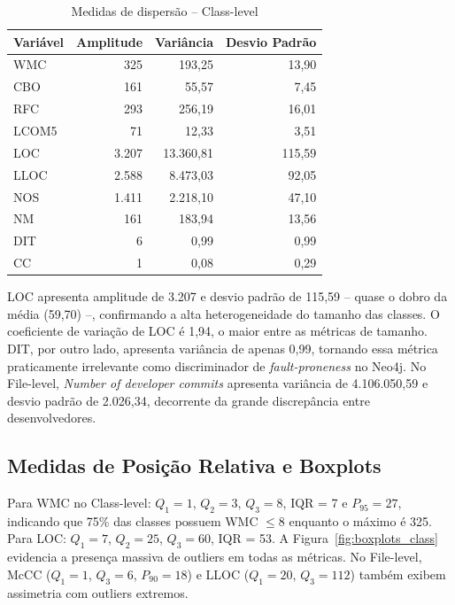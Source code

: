 \documentclass[conference]{IEEEtran}
\begin{document}
\begin{table}[htbp]
\caption{Medidas de dispersão -- Class-level}
\label{tab:dispersao_class}
\centering
\footnotesize
\begin{tabular}{lrrr}
\toprule
\textbf{Variável} & \textbf{Amplitude} & \textbf{Variância} & \textbf{Desvio Padrão} \\
\midrule
WMC   &     325 &      193,25 &  13,90 \\
CBO   &     161 &       55,57 &   7,45 \\
RFC   &     293 &      256,19 &  16,01 \\
LCOM5 &      71 &       12,33 &   3,51 \\
LOC   &   3.207 &   13.360,81 & 115,59 \\
LLOC  &   2.588 &    8.473,03 &  92,05 \\
NOS   &   1.411 &    2.218,10 &  47,10 \\
NM    &     161 &      183,94 &  13,56 \\
DIT   &       6 &        0,99 &   0,99 \\
CC    &       1 &        0,08 &   0,29 \\
\bottomrule
\end{tabular}
\end{table}

LOC apresenta amplitude de 3.207 e desvio padrão de 115,59 -- quase o dobro da média (59,70) --, confirmando a alta heterogeneidade do tamanho das classes. O coeficiente de variação de LOC é 1,94, o maior entre as métricas de tamanho. DIT, por outro lado, apresenta variância de apenas 0,99, tornando essa métrica praticamente irrelevante como discriminador de \textit{fault-proneness} no Neo4j. No File-level, \textit{Number of developer commits} apresenta variância de 4.106.050,59 e desvio padrão de 2.026,34, decorrente da grande discrepância entre desenvolvedores.

\subsection{Medidas de Posição Relativa e Boxplots}

Para WMC no Class-level: $Q_1 = 1$, $Q_2 = 3$, $Q_3 = 8$, IQR = 7 e $P_{95} = 27$, indicando que 75\% das classes possuem WMC $\leq 8$ enquanto o máximo é 325. Para LOC: $Q_1 = 7$, $Q_2 = 25$, $Q_3 = 60$, IQR = 53. A Figura~\ref{fig:boxplots_class} evidencia a presença massiva de outliers em todas as métricas. No File-level, McCC ($Q_1 = 1$, $Q_3 = 6$, $P_{90} = 18$) e LLOC ($Q_1 = 20$, $Q_3 = 112$) também exibem assimetria com outliers extremos.
\end{document}
